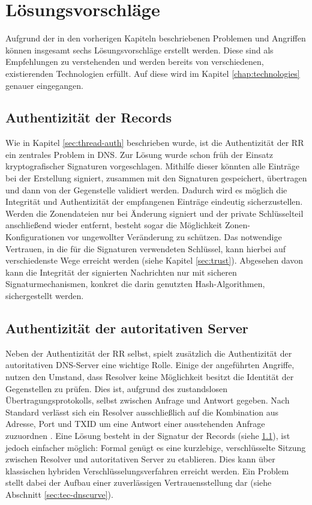 \chapter{Lösungsvorschläge}
\label{chap:solutions}
Aufgrund der in den vorherigen Kapiteln beschriebenen Problemen und Angriffen können insgesamt sechs Lösungsvorschläge erstellt werden. Diese sind als Empfehlungen zu verstehenden und werden bereits von verschiedenen, existierenden Technologien erfüllt. Auf diese wird im Kapitel \ref{chap:technologies} genauer eingegangen.

\section{Authentizität der Records}
\label{sec:solution-recordauth}
Wie in Kapitel \ref{sec:thread-auth} beschrieben wurde, ist die Authentizität der RR ein zentrales Problem in DNS. Zur Lösung wurde schon früh der Einsatz kryptografischer Signaturen vorgeschlagen. Mithilfe dieser könnten alle Einträge bei der Erstellung signiert, zusammen mit den Signaturen gespeichert, übertragen und dann von der Gegenstelle validiert werden. Dadurch wird es möglich die Integrität und Authentizität der empfangenen Einträge eindeutig sicherzustellen. Werden die Zonendateien nur bei Änderung signiert und der private Schlüsselteil anschließend wieder entfernt, besteht sogar die Möglichkeit Zonen-Konfigurationen vor ungewollter Veränderung zu schützen. Das notwendige Vertrauen, in die für die Signaturen verwendeten Schlüssel, kann hierbei auf verschiedenste Wege erreicht werden (siehe Kapitel \ref{sec:trust}). Abgesehen davon kann die Integrität der signierten Nachrichten nur mit sicheren Signaturmechanismen, konkret die darin genutzten Hash-Algorithmen, sichergestellt werden\cite{Stevens2017}. 

\section{Authentizität der autoritativen Server}
Neben der Authentizität der RR selbst, spielt zusätzlich die Authentizität der autoritativen DNS-Server eine wichtige Rolle. Einige der angeführten Angriffe, nutzen den Umstand, dass Resolver keine Möglichkeit besitzt die Identität der Gegenstellen zu prüfen. Dies ist, aufgrund des zustandslosen Übertragungsprotokolls, selbst zwischen Anfrage und Antwort gegeben. Nach Standard verlässt sich ein Resolver ausschließlich auf die Kombination aus Adresse, Port und TXID um eine Antwort einer ausstehenden Anfrage zuzuordnen \cite{rfc1035}. Eine Lösung besteht in der Signatur der Records (siehe \ref{sec:solution-recordauth}), ist jedoch einfacher möglich: Formal genügt es eine kurzlebige, verschlüsselte Sitzung zwischen Resolver und autoritativen Server zu etablieren. Dies kann über klassischen hybriden Verschlüsselungsverfahren erreicht werden. Ein Problem stellt dabei der Aufbau einer zuverlässigen Vertrauensstellung dar (siehe Abschnitt \ref{sec:tec-dnscurve}).

